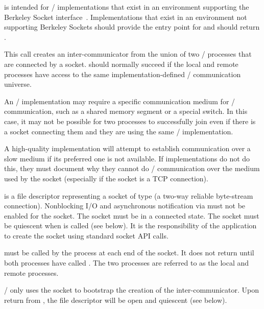  is intended for \MPI/ implementations
that exist in an environment supporting the Berkeley Socket
interface~\cite{sockettutorial,psdbook}.
Implementations that exist in an environment not supporting Berkeley Sockets
should provide the entry point for 
and should return .

This call creates an inter-communicator from the union of two \MPI/
processes that are connected by a socket.
 should normally
succeed if the local and remote processes have access to
the same implementation-defined \MPI/ communication universe.

\begin{users} An \MPI/ implementation may require a specific
communication medium for \MPI/ communication, such as a shared memory
segment or a special switch. In this case, it may not be possible for
two processes to successfully join even if there is a socket
connecting them and they are using the same \MPI/ implementation.
\end{users}

\begin{implementors}
A high-quality implementation will attempt to establish
communication over a slow medium if its preferred one
is not available.
If implementations do not do this, they must document
why they cannot do \MPI/ communication over the medium
used by the socket (especially if the socket is a TCP
connection).
\end{implementors}


 is a file descriptor representing a socket of type
 (a two-way reliable byte-stream connection).
Nonblocking I/O and asynchronous notification via 
must not be enabled for the socket. The socket must be in a connected
state.  The socket must be quiescent when
 is called (see below). It is the responsibility
of the application to create the socket using standard socket API
calls.

 must be called by the process at each end of the
socket. It does not return until both processes have called
. The two processes are referred to as the local
and remote processes.

\MPI/ only uses the socket to bootstrap the creation of the inter-communicator.
Upon return from , the
file descriptor will be open and quiescent (see below).

